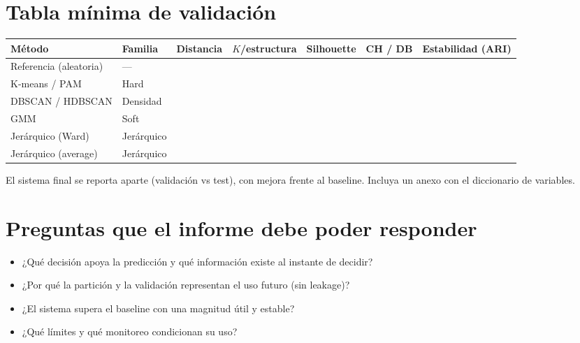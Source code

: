 \documentclass[11pt,letterpaper]{article}
\begin{document}
\section*{Tabla mínima de validación}
\begin{center}\small
\begin{tabular}{lllllll}
\toprule
Método & Familia & Distancia & $K$/estructura & Silhouette & CH / DB & Estabilidad (ARI) \\
\midrule
Referencia (aleatoria) & --- & & & & & \\
K-means / PAM & Hard & & & & & \\
DBSCAN / HDBSCAN & Densidad & & & & & \\
GMM & Soft & & & & & \\
Jerárquico (Ward) & Jerárquico & & & & & \\
Jerárquico (average) & Jerárquico & & & & & \\
\bottomrule
\end{tabular}\end{center}

El sistema final se reporta aparte (validación vs test), con mejora frente al baseline. Incluya un anexo con el diccionario de variables.

\section*{Preguntas que el informe debe poder responder}
\begin{itemize}
\item ¿Qué decisión apoya la predicción y qué información existe al instante de decidir?
\item ¿Por qué la partición y la validación representan el uso futuro (sin leakage)?
\item ¿El sistema supera el baseline con una magnitud útil y estable?
\item ¿Qué límites y qué monitoreo condicionan su uso?
\end{itemize}
\end{document}
